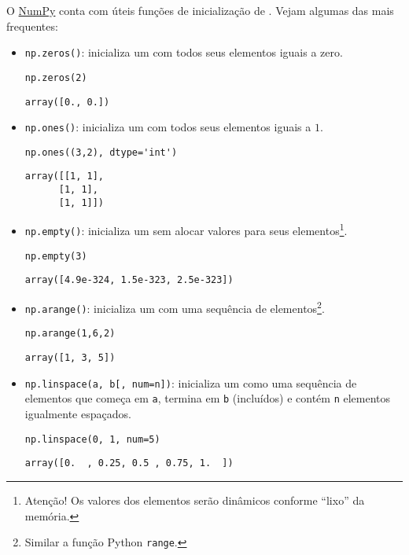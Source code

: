 \documentclass[12pt]{article}
\begin{document}
O \href{https://numpy.org/}{NumPy} conta com úteis funções de inicialização de {\PYTHONnumpyDOTarray}. Vejam algumas das mais frequentes:
\begin{itemize}
\item \lstinline+np.zeros()+: inicializa um {\PYTHONnumpyDOTarray} com todos seus elementos iguais a zero.
  
\begin{lstlisting}
np.zeros(2)
\end{lstlisting}

\begin{verbatim}
array([0., 0.])
\end{verbatim}

  \item \lstinline+np.ones()+: inicializa um {\PYTHONnumpyDOTarray} com todos seus elementos iguais a $1$.

\begin{lstlisting}
np.ones((3,2), dtype='int')
\end{lstlisting}

\begin{verbatim}
array([[1, 1],
      [1, 1],
      [1, 1]])
\end{verbatim}

  \item \lstinline+np.empty()+: inicializa um {\PYTHONnumpyDOTarray} sem alocar valores para seus elementos\footnote{Atenção! Os valores dos elementos serão dinâmicos conforme ``lixo'' da memória.}.
  
\begin{lstlisting}
np.empty(3)
\end{lstlisting}

\begin{verbatim}
array([4.9e-324, 1.5e-323, 2.5e-323])
\end{verbatim}

  \item \lstinline+np.arange()+: inicializa um {\PYTHONnumpyDOTarray} com uma sequência de elementos\footnote{Similar a função Python \lstinline+range+.}.

\begin{lstlisting}
np.arange(1,6,2)
\end{lstlisting}

\begin{verbatim}
array([1, 3, 5])
\end{verbatim}

  \item \lstinline+np.linspace(a, b[, num=n])+: inicializa um {\PYTHONnumpyDOTarray} como uma sequência de elementos que começa em \lstinline+a+, termina em \lstinline+b+ (incluídos) e contém \lstinline+n+ elementos igualmente espaçados.

\begin{lstlisting}
np.linspace(0, 1, num=5)
\end{lstlisting}

\begin{verbatim}
array([0.  , 0.25, 0.5 , 0.75, 1.  ])
\end{verbatim}

\end{itemize}
\end{document}
